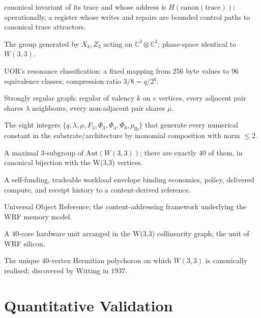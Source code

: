 \documentclass[11pt,letterpaper]{article}
\theoremstyle{remark}
\newcommand{\W}{W(3,3)}
\newcommand{\Aut}{\mathrm{Aut}}
\newcommand{\CC}{\mathbb{C}}
\begin{document}
\begin{description}[leftmargin=10em,style=nextline,nosep]
canonical invariant of its trace and whose address is $H(\mathrm{canon}(\mathrm{trace}))$;
operationally, a register whose writes and repairs are bounded control paths to canonical
trace attractors.
\item[Pauli group, two-qutrit] The group generated by $X_3, Z_3$ acting on
$\CC^3 \otimes \CC^3$; phase-space identical to $\W$.
\item[$R_{96}$] UOR's resonance classification: a fixed mapping from $256$ byte values
to $96$ equivalence classes; compression ratio $3/8 = q/2^q$.
\item[SRG$(v, k, \lambda, \mu)$] Strongly regular graph: regular of valency $k$ on $v$
vertices, every adjacent pair shares $\lambda$ neighbours, every non-adjacent pair
shares $\mu$.
\item[Substrate primitives] The eight integers $\{q, \lambda, \mu, F_5, \Phi_3, \Phi_4,
\Phi_6, p_{\mathrm{Ih}}\}$ that generate every numerical constant in the
substrate/architecture by monomial composition with norm $\leq 2$.
\item[Sylow-$3$ subgroup] A maximal $3$-subgroup of $\Aut(\W)$; there are exactly $40$
of them, in canonical bijection with the W(3,3) vertices.
\item[Smart Asset] A self-funding, tradeable workload envelope binding economics,
policy, delivered compute, and receipt history to a content-derived reference.
\item[UOR] Universal Object Reference; the content-addressing framework underlying the
WRF memory model.
\item[Witting tile] A $40$-core hardware unit arranged in the W(3,3) collinearity
graph; the unit of WRF silicon.
\item[Witting polytope] The unique $40$-vertex Hermitian polychoron on which $\W$
is canonically realised; discovered by Witting in $1937$.
\end{description}

\section{Quantitative Validation}
\end{document}
